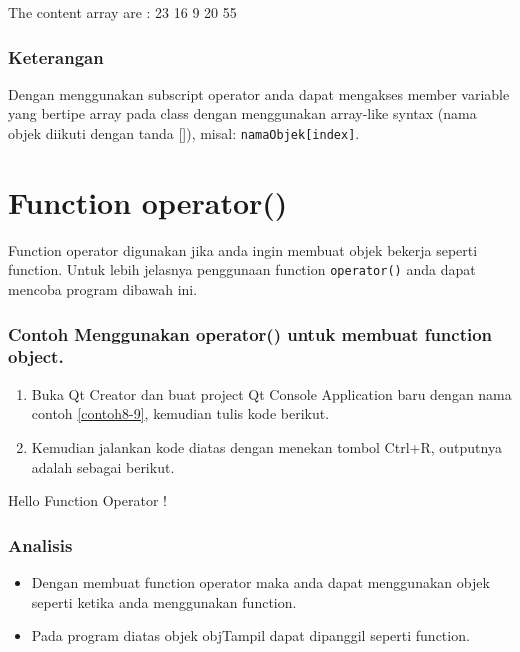 \begin{lcverbatim}
The content array are : {23 16 9 20 55 }
\end{lcverbatim}

\subsubsection*{Keterangan}

Dengan menggunakan subscript operator anda dapat mengakses member
variable yang bertipe array pada class dengan menggunakan array-like
syntax (nama objek diikuti dengan tanda {[}{]}), misal:
\texttt{namaObjek{[}index{]}}.

\section{Function operator()}\label{function-operator}

Function operator digunakan jika anda ingin membuat objek bekerja
seperti function. Untuk lebih jelasnya penggunaan function
\texttt{operator()} anda dapat mencoba program dibawah ini.

\subsubsection*{Contoh  Menggunakan operator() untuk membuat function object.}

\begin{enumerate}

\item
  Buka Qt Creator dan buat project Qt Console Application baru dengan
  nama contoh \ref{contoh8-9}, kemudian tulis kode berikut.




\item
  Kemudian jalankan kode diatas dengan menekan tombol Ctrl+R, outputnya
  adalah sebagai berikut.
\end{enumerate}

\begin{lcverbatim}
Hello Function Operator !
\end{lcverbatim}

\subsubsection*{Analisis}

\begin{itemize}

\item
  Dengan membuat function operator maka anda dapat menggunakan objek
  seperti ketika anda menggunakan function.
\item
  Pada program diatas objek objTampil dapat dipanggil seperti function.
\end{itemize}
